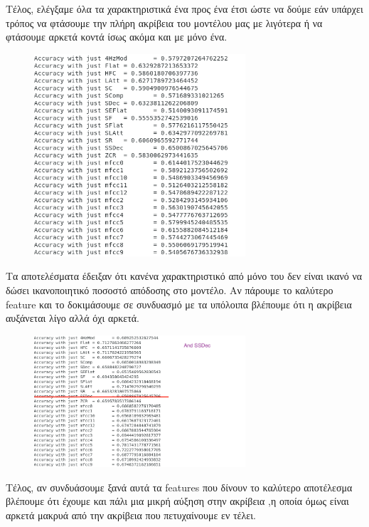 Τέλος, ελέγξαμε όλα τα χαρακτηριστικά ένα προς ένα έτσι ώστε να δούμε εάν υπάρχει τρόπος να φτάσουμε την πλήρη ακρίβεια του μοντέλου μας με λιγότερα ή να φτάσουμε αρκετά κοντά ίσως ακόμα και με μόνο ένα. 

\begin{figure}[h]
\centering
\includegraphics[width=0.7\textwidth]{features.png}
\end{figure}

Τα αποτελέσματα έδειξαν ότι κανένα χαρακτηριστικό από μόνο του δεν είναι ικανό να δώσει ικανοποιητικό ποσοστό απόδοσης στο μοντέλο. Αν πάρουμε το καλύτερο feature και το δοκιμάσουμε σε συνδυασμό με τα υπόλοιπα βλέπουμε ότι η ακρίβεια αυξάνεται λίγο αλλά όχι αρκετά.  

\begin{figure}[H]
\centering
\includegraphics[width=0.7\textwidth]{features_win.png}
\end{figure}

Τέλος, αν συνδυάσουμε ξανά αυτά τα features που δίνουν το καλύτερο αποτέλεσμα βλέπουμε ότι έχουμε και πάλι μια μικρή αύξηση στην ακρίβεια ,η οποία όμως είναι αρκετά μακρυά από την ακρίβεια που πετυχαίνουμε εν τέλει. 


